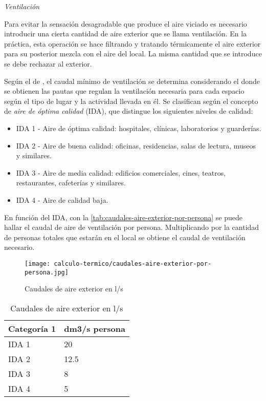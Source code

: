 \emph{Ventilaci\'on}

Para evitar la sensaci\'on desagradable que produce el aire viciado es necesario introducir una cierta cantidad de aire exterior que se llama ventilaci\'on. En la pr\'actica, esta operaci\'on se hace filtrando y tratando t\'ermicamente el aire exterior para su posterior mezcla con el aire del local. La misma cantidad que se introduce se debe rechazar al exterior.

Según el  de \textcite{carrier2009}, el caudal mínimo de ventilación se determina considerando el  donde se obtienen las pautas que regulan la ventilaci\'on necesaria para cada espacio seg\'un el tipo de lugar y la actividad llevada en \'el. Se clasifican seg\'un el concepto de \emph{aire de óptima calidad} (IDA), que distingue los siguientes niveles de calidad:
\begin{itemize}
	\item IDA 1 - Aire de \'optima calidad: hospitales, cl\'inicas, laboratorios y guarder\'ias.
	\item IDA 2 - Aire de buena calidad: oficinas, residencias, salas de lectura, museos y similares.
	\item IDA 3 - Aire de media calidad: edificios comerciales, cines, teatros, restaurantes, cafeter\'ias y similares.
	\item IDA 4 - Aire de calidad baja.
\end{itemize}
En funci\'on del IDA, con la \autoref{tab:caudales-aire-exterior-por-persona} se puede hallar el caudal de aire de ventilaci\'on por persona. Multiplicando por la cantidad de personas totales que estar\'an en el local se obtiene el caudal de ventilaci\'on necesario.
\begin{figure}
    \centering
    \caption{Caudales de aire exterior en l/s}
    \label{fig:caudales-aire-exterior-por-persona}
    \texttt{[image: calculo-termico/caudales-aire-exterior-por-persona.jpg]}

\end{figure}

\begin{table}[h]
	\centering\caption{Caudales de aire exterior en l/s}
	\label{tab:caudales-aire-exterior-por-persona}
	\begin{tabular}{ll}
		\hline
		Categoría 1 & dm3/s persona \\ \hline
		IDA 1    & 20    \\ \hline
		IDA 2    & 12.5    \\ \hline
		IDA 3    & 8    \\ \hline
		IDA 4    & 5    \\ \hline
	\end{tabular}
\end{table}

